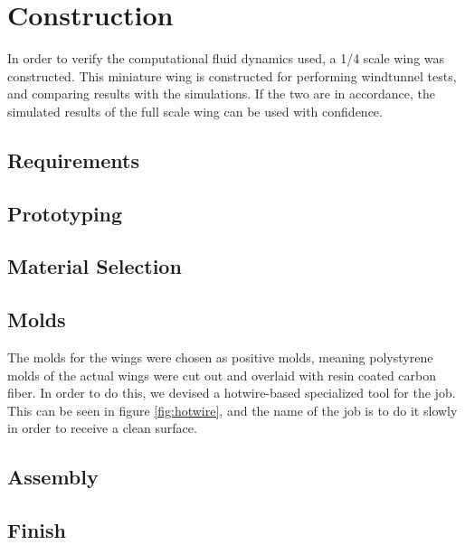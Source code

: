 \chapter{Construction}

In order to verify the computational fluid dynamics used, a 1/4 scale wing was constructed. This miniature wing is constructed for performing windtunnel tests, and comparing results with the simulations. If the two are in accordance, the simulated results of the full scale wing can be used with confidence.

\section{Requirements}




\section{Prototyping}

\section{Material Selection}

\section{Molds}

The molds for the wings were chosen as positive molds, meaning polystyrene molds of the actual wings were cut out and overlaid with resin coated carbon fiber. In order to do this, we devised a hotwire-based specialized tool for the job. This can be seen in figure \ref{fig:hotwire}, and the name of the job is to do it slowly in order to receive a clean surface.

\section{Assembly}

\section{Finish}

